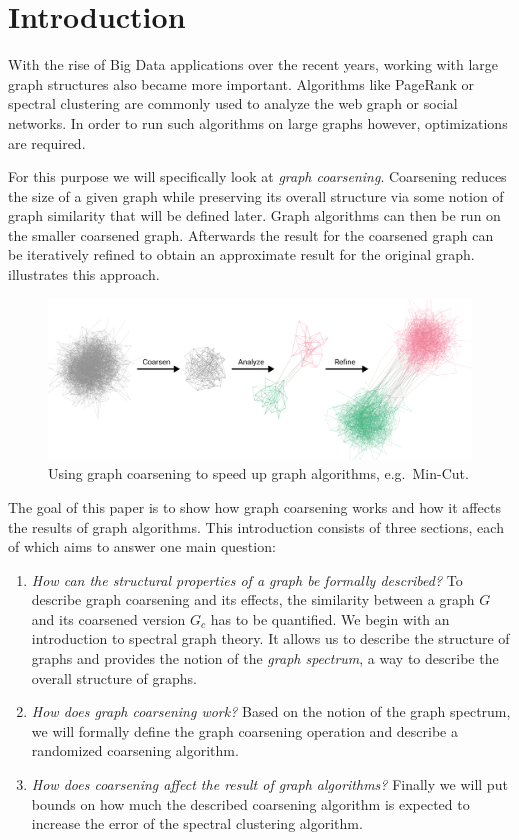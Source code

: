 \section{Introduction}%
\label{sec:intro}

\setcounter{page}{1}			%

With the rise of Big Data applications over the recent years, working with large graph structures also became more important.
Algorithms like PageRank or spectral clustering are commonly used to analyze the web graph or social networks.
In order to run such algorithms on large graphs however, optimizations are required.

For this purpose we will specifically look at \textit{graph coarsening}.
Coarsening reduces the size of a given graph while preserving its overall structure via some notion of graph similarity that will be defined later.
Graph algorithms can then be run on the smaller coarsened graph.
Afterwards the result for the coarsened graph can be iteratively refined to obtain an approximate result for the original graph.
 illustrates this approach.
\begin{figure}[ht]
	\centering
	\includegraphics[width=0.8\linewidth]{gfx/intro/overview.pdf}
	\caption{
		Using graph coarsening to speed up graph algorithms, e.g.\  Min-Cut.
	}\label{fig:intro:overview}
\end{figure}

The goal of this paper is to show how graph coarsening works and how it affects the results of graph algorithms.
This introduction consists of three sections, each of which aims to answer one main question:
\begin{enumerate}
	\item \textit{How can the structural properties of a graph be formally described?}
		To describe graph coarsening and its effects, the similarity between a graph $G$ and its coarsened version $G_c$ has to be quantified.
		We begin with an introduction to spectral graph theory.
		It allows us to describe the structure of graphs and provides the notion of the \textit{graph spectrum}, a way to describe the overall structure of graphs.
	\item \textit{How does graph coarsening work?}
		Based on the notion of the graph spectrum, we will formally define the graph coarsening operation and describe a randomized coarsening algorithm.
	\item \textit{How does coarsening affect the result of graph algorithms?}
		Finally we will put bounds on how much the described coarsening algorithm is expected to increase the error of the spectral clustering algorithm.
\end{enumerate}
